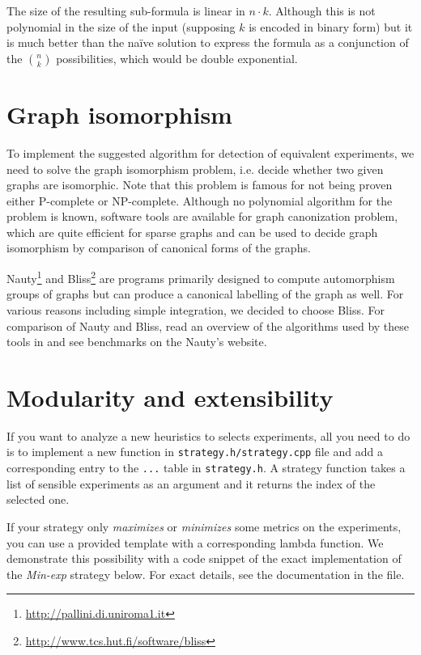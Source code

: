 The size of the resulting sub-formula is linear in $n\cdot k$.
Although this is not polynomial in the size of the input
  (supposing $k$ is encoded in binary form) but it is much better
  than the na\"ive solution to express the formula
  as a conjunction of the $n\choose k$ possibilities,
  which would be double exponential.

\section{Graph isomorphism}

To implement the suggested algorithm for detection of equivalent experiments,
  we need to solve the graph isomorphism problem, i.e. decide whether
  two given graphs are isomorphic.
Note that this problem is famous for not being proven either P-complete or
  NP-complete.
Although no polynomial algorithm for the problem is known,
  software tools are available for graph canonization problem,
  which are quite efficient for sparse graphs and can be used to
  decide graph isomorphism by comparison of canonical forms of the graphs.

Nauty\footnote{\url{http://pallini.di.uniroma1.it}}\cite{nauty} and
  Bliss\footnote{\url{http://www.tcs.hut.fi/software/bliss}}\cite{bliss}
  are programs primarily designed to compute automorphism groups of graphs
  but can produce a canonical labelling of the graph as well.
For various reasons including simple integration, we decided to choose Bliss.
For comparison of Nauty and Bliss,
  read an overview of the algorithms used by these tools in \cite{nautyblissoverview}
  and see benchmarks on the Nauty's website.

\section{Modularity and extensibility}


If you want to analyze a new heuristics to selects experiments,
  all you need to do is to implement a new function
  in \texttt{strategy.h/strategy.cpp} file and add a corresponding entry
  to the \texttt{...} table in \texttt{strategy.h}.
A strategy function takes a list of sensible experiments as an argument
  and it returns the index of the selected one.

If your strategy only \emph{maximizes} or \emph{minimizes}
  some metrics on the experiments,
  you can use a provided template with a corresponding lambda function.
We demonstrate this possibility with a code snippet of
  the exact implementation of the \emph{Min-exp} strategy below.
For exact details, see the documentation in the file.


